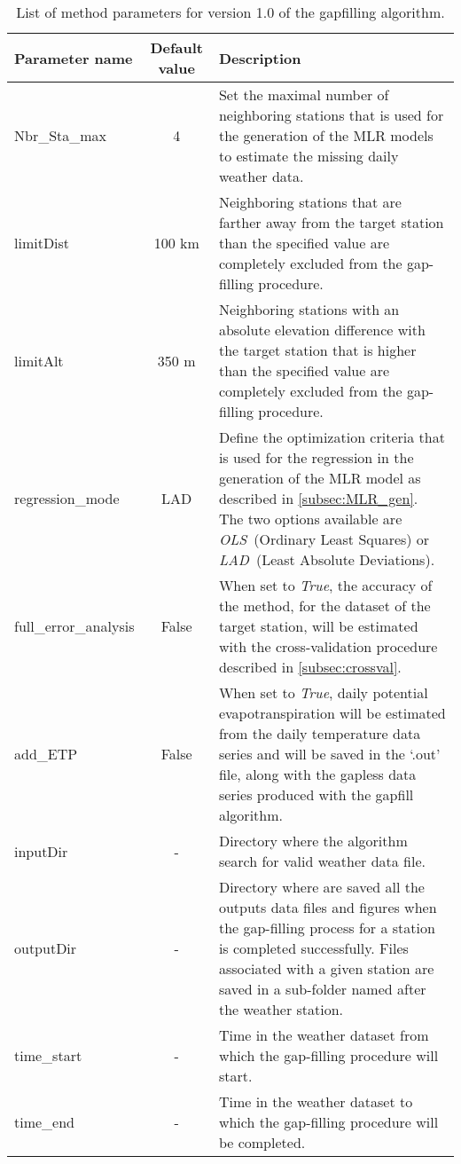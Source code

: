 \documentclass[ARTICLETHERMIC.tex]{subfiles}
\begin{document}
\begin{table}[!h]
    \centering
    \caption{List of method parameters for version 1.0 of the gapfilling algorithm.}
    \begin{tabular}{lcp{10.5cm}}
        \toprule
        Parameter name & Default value & Description\\
        \midrule
        Nbr\_Sta\_max & 4 & Set the maximal number of neighboring stations that is used for the generation of the MLR models to estimate the missing daily weather data.\\[1em]
        limitDist & 100 km & Neighboring stations that are farther away from the target station than the specified value are completely excluded from the gap-filling procedure. \\[1em]
        limitAlt & 350 m & Neighboring stations with an absolute elevation difference with the target station that is higher than the specified value are completely excluded from the gap-filling procedure.\\[1em]
        regression\_mode & LAD & Define the optimization criteria that is used for the regression in the generation of the MLR model as described in \cref{subsec:MLR_gen}. The two options available are \emph{OLS}~(Ordinary Least Squares) or \emph{LAD}~(Least Absolute Deviations). \\[1em]
        full\_error\_analysis & False & When set to \emph{True}, the accuracy of the method, for the dataset of the target station, will be estimated with the cross-validation procedure described in \cref{subsec:crossval}. \\[1em]
        add\_ETP & False & When set to \emph{True}, daily potential evapotranspiration will be estimated from the daily temperature data series and will be saved in the `.out' file, along with the gapless data series produced with the gapfill algorithm. \\[1em]
        inputDir & - & Directory where the algorithm search for valid weather data file. \\[1em]
        outputDir  & - & Directory where are saved all the outputs data files and figures when the gap-filling process for a station is completed successfully. Files associated with a given station are saved in a sub-folder named after the weather station. \\[1em]
        time\_start & - & Time in the weather dataset from which the gap-filling procedure will start. \\[1em]
        time\_end & - & Time in the weather dataset to which the gap-filling procedure will be completed. \\[1em]
        \bottomrule
    \end{tabular}
    \label{tab:method_parameter}
\end{table}
\end{document}
